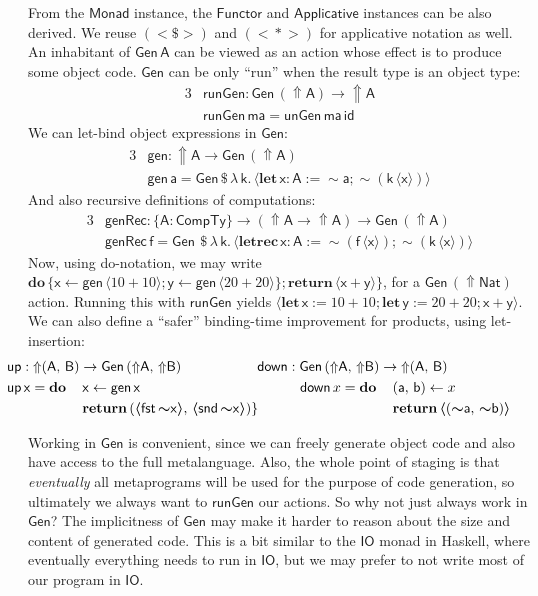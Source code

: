 \documentclass[acmsmall,screen,review,anonymous]{acmart}
\newcommand{\mit}[1]{{\mathsf{#1}}}
\newcommand{\msf}[1]{{\mathsf{#1}}}
\newcommand{\mbf}[1]{{\mathbf{#1}}}
\newcommand{\bs}[1]{\boldsymbol{#1}}
\newcommand{\mdo}{\mbf{do}\,}
\newcommand{\ind}{\hspace{1em}}
\newcommand{\return}{\mbf{return}\,}
\newcommand{\lam}{\lambda\,}
\newcommand{\letrec}{\mbf{letrec}\,}
\newcommand{\letdef}{\mbf{let\,}}
\newcommand{\vma}{\mathsf{ma}}
\newcommand{\vk}{\mathsf{k}}
\newcommand{\vA}{\mathsf{A}}
\newcommand{\vB}{\mathsf{B}}
\newcommand{\va}{\mathsf{a}}
\newcommand{\vb}{\mathsf{b}}
\newcommand{\vx}{\mathsf{x}}
\newcommand{\vy}{\mathsf{y}}
\newcommand{\vf}{\mathsf{f}}
\newcommand{\Monad}{\msf{Monad}}
\newcommand{\Applicative}{\msf{Applicative}}
\newcommand{\Functor}{\msf{Functor}}
\newcommand{\fro}{\leftarrow}
\newcommand{\Up}{{\Uparrow}}
\newcommand{\spl}{{\bs{\sim}}}
\newcommand{\ql}{{\bs{\langle}}}
\newcommand{\qr}{{\bs{\rangle}}}
\newcommand{\CTy}{\msf{CompTy}}
\newcommand{\fst}{\msf{fst}}
\newcommand{\snd}{\msf{snd}}
\newcommand{\Nat}{\msf{Nat}}
\theoremstyle{remark}
\newcommand{\id}{\mit{id}}
\newcommand{\mup}{\mit{up}}
\newcommand{\mdown}{\mit{down}}
\newcommand{\Gen}{\msf{Gen}}
\newcommand{\unGen}{\mit{unGen}}
\newcommand{\gen}{\mit{gen}}
\newcommand{\genRec}{\mit{genRec}}
\newcommand{\fmap}{<\!\!\$\!\!>}
\newcommand{\ap}{{<\!\!*\!\!>}}
\newcommand{\runGen}{\mit{runGen}}
\newcommand{\qt}[1]{\ql#1\qr}
\newcommand{\dlr}{\,\$\,}
\begin{document}
From the $\Monad$ instance, the $\Functor$ and $\Applicative$ instances can be
also derived. We reuse $({\fmap})$ and $({\ap})$ for applicative notation as well.
An inhabitant of $\Gen\,\vA$ can be viewed as an action whose effect is to produce
some object code. $\Gen$ can be only ``run'' when the result type is an object
type:
\begin{alignat*}{3}
  &\runGen : \Gen\,(\Up \vA) \to \Up \vA\\
  &\runGen\,\vma = \unGen\,\vma\,\id
\end{alignat*}
We can let-bind object expressions in $\Gen$:
\begin{alignat*}{3}
  & \gen : \Up \vA \to \Gen\,(\Up \vA) \\
  & \gen\,\va = \Gen \dlr \lam \vk.\,\ql \letdef \vx : \vA := \spl \va; \spl(\vk\,\ql \vx \qr) \qr
\end{alignat*}
And also recursive definitions of computations:
\begin{alignat*}{3}
  & \genRec : \{\vA : \CTy\} \to (\Up \vA \to \Up \vA) \to \Gen\,(\Up \vA) \\
  & \genRec\,\vf = \Gen\ \dlr \lam \vk.\,\qt{\letrec \vx : \vA := \spl(\vf\,\qt{\vx}); \spl(\vk\,\qt{\vx})}
\end{alignat*}
Now, using do-notation, we may write $\mdo \{\vx \fro \gen\,\qt{10 + 10}; \vy \fro
\gen\,\qt{20 + 20}\};\return \qt{\vx + \vy}\}$, for a $\Gen\,(\Up \Nat)$
action. Running this with $\runGen$ yields $\qt{\letdef \vx := 10 + 10; \letdef \vy
  := 20 + 20; \vx + \vy}$. We can also define a ``safer'' binding-time improvement for
products, using let-insertion:
\begin{alignat*}{6}
  &\hspace{-2em}\mathrlap{\mup : \Up (\vA,\,\vB) \to \Gen\,(\Up \vA,\,\Up \vB)            \hspace{5.45em} \mdown : \Gen\,(\Up \vA,\, \Up \vB) \to \Up(\vA,\,\vB)} \\
  &\hspace{-2em}\mup\,\vx = \mdo &&\vx \fro \gen\,\vx                                    && \ind\ind \mdown\,x = \mdo &&(\va,\,\vb) \fro x\\
  &\hspace{-2em}               &&\return (\qt{\fst\,\spl \vx},\,\qt{\snd\,\spl \vx})\} &&                           &&\return \qt{(\spl \va,\, \spl \vb)}
\end{alignat*}

Working in $\Gen$ is convenient, since we can freely generate object code and
also have access to the full metalanguage. Also, the whole point of staging is
that \emph{eventually} all metaprograms will be used for the purpose of code
generation, so ultimately we always want to $\runGen$ our actions. So why not
just always work in $\Gen$? The implicitness of $\Gen$ may make it harder to
reason about the size and content of generated code. This is a bit similar to
the $\msf{IO}$ monad in Haskell, where eventually everything needs to run in
$\msf{IO}$, but we may prefer to not write most of our program in $\msf{IO}$.
\end{document}
